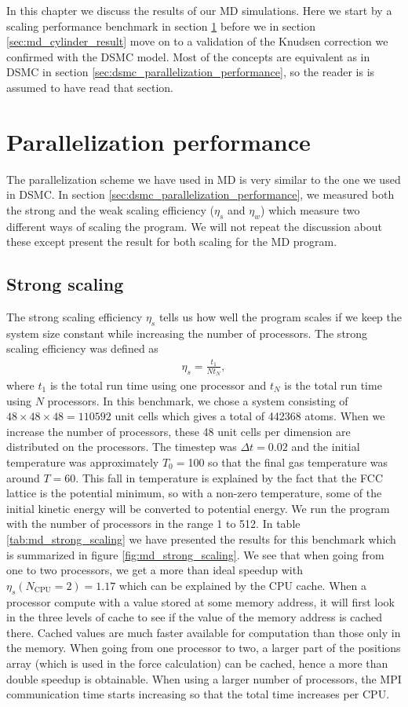 In this chapter we discuss the results of our MD simulations. Here we start by a scaling performance benchmark in section \ref{sec:md_benchmark} before we in section \ref{sec:md_cylinder_result} move on to a validation of the Knudsen correction we confirmed with the DSMC model. Most of the concepts are equivalent as in DSMC in section \ref{sec:dsmc_parallelization_performance}, so the reader is is assumed to have read that section.

\section{Parallelization performance}
\label{sec:md_benchmark}
The parallelization scheme we have used in MD is very similar to the one we used in DSMC. In section \ref{sec:dsmc_parallelization_performance}, we measured both the strong and the weak scaling efficiency ($\eta_s$ and $\eta_w$) which measure two different ways of scaling the program. We will not repeat the discussion about these except present the result for both scaling for the MD program. 

\subsection{Strong scaling}
The strong scaling efficiency $\eta_s$ tells us how well the program scales if we keep the system size constant while increasing the number of processors. The strong scaling efficiency was defined as
\begin{align}
	\eta_s = \frac{t_1}{Nt_N},
\end{align}
where $t_1$ is the total run time using one processor and $t_N$ is the total run time using $N$ processors. In this benchmark, we chose a system consisting of $48\times48\times48=110592$ unit cells which gives a total of 442368 atoms. When we increase the number of processors, these 48 unit cells per dimension are distributed on the processors. The timestep was $\Delta t = 0.02$ and the initial temperature was approximately $T_0=$\unit{100}{\kelvin} so that the final gas temperature was around $T=$\unit{60}{\kelvin}. This fall in temperature is explained by the fact that the FCC lattice is the potential minimum, so with a non-zero temperature, some of the initial kinetic energy will be converted to potential energy. We run the program with the number of processors in the range 1 to 512. In table \ref{tab:md_strong_scaling} we have presented the results for this benchmark which is summarized in figure \ref{fig:md_strong_scaling}. We see that when going from one to two processors, we get a more than ideal speedup with $\eta_s(N_\text{CPU}=2)=1.17$ which can be explained by the CPU cache. When a processor compute with a value stored at some memory address, it will first look in the three levels of cache to see if the value of the memory address is cached there. Cached values are much faster available for computation than those only in the memory. When going from one processor to two, a larger part of the positions array (which is used in the force calculation) can be cached, hence a more than double speedup is obtainable. When using a larger number of processors, the MPI communication time starts increasing so that the total time increases per CPU. 

